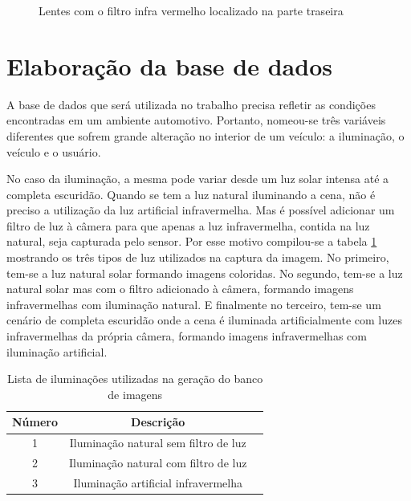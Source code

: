 \begin{figure}[ht!]
	\centering
	\setlength{\fboxsep}{1pt}
  	\caption{Lentes com o filtro infra vermelho localizado na parte traseira}
  	\label{fig:camera_02}
\end{figure}

\section{Elaboração da base de dados}

A base de dados que será utilizada no trabalho precisa refletir as condições encontradas em um ambiente automotivo. Portanto, nomeou-se três variáveis diferentes que sofrem grande alteração no interior de um veículo: a iluminação, o veículo e o usuário.

No caso da iluminação, a mesma pode variar desde um luz solar intensa até a completa escuridão. Quando se tem a luz natural iluminando a cena, não é preciso a utilização da luz artificial infravermelha. Mas é possível adicionar um filtro de luz à câmera para que apenas a luz infravermelha, contida na luz natural, seja capturada pelo sensor. Por esse motivo compilou-se a tabela \ref{table:iluminacao} mostrando os três tipos de luz utilizados na captura da imagem. No primeiro, tem-se a luz natural solar formando imagens coloridas. No segundo, tem-se a luz natural solar mas com o filtro adicionado à câmera, formando imagens infravermelhas com iluminação natural. E finalmente no terceiro, tem-se um cenário de completa escuridão onde a cena é iluminada artificialmente com luzes infravermelhas da própria câmera, formando imagens infravermelhas com iluminação artificial.

\begin{table}[h]
	\centering
	\begin{tabular}{|c|c|c|}
		\hline Número & Descrição	 					\\
		\hline 1 & Iluminação natural sem filtro de luz \\
		\hline 2 & Iluminação natural com filtro de luz \\
		\hline 3 & Iluminação artificial infravermelha	\\
		\hline
	\end{tabular}
	\caption{Lista de iluminações utilizadas na geração do banco de imagens}
	\label{table:iluminacao}
\end{table}
 
